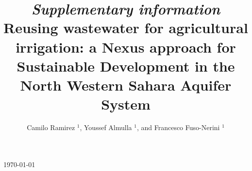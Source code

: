 \documentclass[12pt]{iopart}
\begin{document}
\title[\textit{SI} - Reusing wastewater in agriculture: a Nexus assessment in the NWSAS]{\textit{Supplementary information}\\[12pt] \large Reusing wastewater for agricultural irrigation: a Nexus approach for Sustainable Development in the North Western Sahara Aquifer System}


\author{Camilo Ramirez $^{1}$, Youssef Almulla $^{1}$, and Francesco Fuso-Nerini $^{1}$}

\address{$^{1}$ KTH Royal Institute of Technology, Stockholm, Sweden}
\vspace{10pt}
\begin{indented}
\item[]\today
\end{indented}

\tableofcontents
\end{document}
